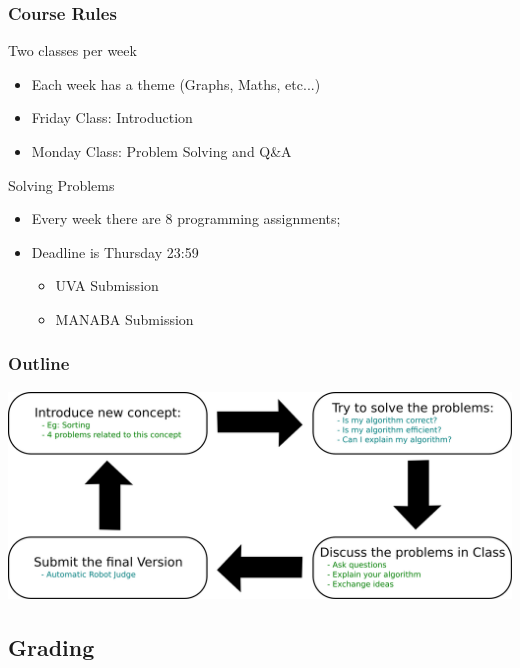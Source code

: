 \documentclass{beamer}
\begin{document}
\begin{frame}
    \frametitle{Course Rules}

    \begin{block}{Two classes per week}
        \begin{itemize}
        \item Each week has a theme (Graphs, Maths, etc...)
        \item Friday Class: Introduction
        \item Monday Class: Problem Solving and Q\&A
        \end{itemize}
    \end{block}

    \begin{block}{Solving Problems}
        \begin{itemize}
        \item Every week there are 8 programming assignments;
        \item Deadline is Thursday 23:59
        \begin{itemize}
          \item UVA Submission
          \item MANABA Submission
        \end{itemize}
        \end{itemize}
    \end{block}
\end{frame}

\begin{frame}
  \frametitle{Outline}
  \begin{center}
    \includegraphics[width=1\textwidth]{../img/classoutline}
  \end{center}
\end{frame}

\subsection{Grading}
\end{document}
